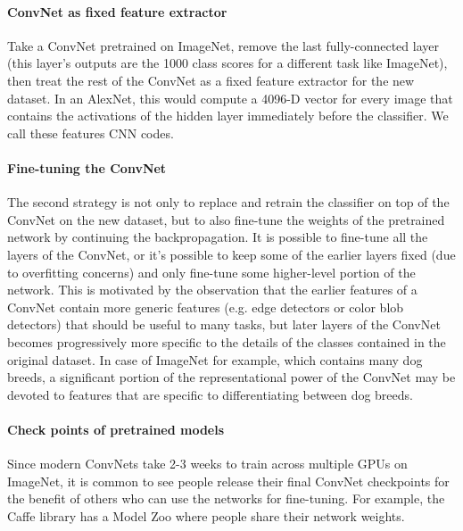 \paragraph*{ConvNet as fixed feature extractor} Take a ConvNet pretrained on ImageNet, remove the last fully-connected layer (this layer’s outputs are the 1000 class scores for a different task like ImageNet), then treat the rest of the ConvNet as a fixed feature extractor for the new dataset. In an AlexNet, this would compute a 4096-D vector for every image that contains the activations of the hidden layer immediately before the classifier. We call these features CNN codes. 
\paragraph*{Fine-tuning the ConvNet} The second strategy is not only to replace and retrain the classifier on top of the ConvNet on the new dataset, but to also fine-tune the weights of the pretrained network by continuing the backpropagation. It is possible to fine-tune all the layers of the ConvNet, or it’s possible to keep some of the earlier layers fixed (due to overfitting concerns) and only fine-tune some higher-level portion of the network. This is motivated by the observation that the earlier features of a ConvNet contain more generic features (e.g. edge detectors or color blob detectors) that should be useful to many tasks, but later layers of the ConvNet becomes progressively more specific to the details of the classes contained in the original dataset. In case of ImageNet for example, which contains many dog breeds, a significant portion of the representational power of the ConvNet may be devoted to features that are specific to differentiating between dog breeds.

\paragraph*{Check points of pretrained models} Since modern ConvNets take 2-3 weeks to train across multiple GPUs on ImageNet, it is common to see people release their final ConvNet checkpoints for the benefit of others who can use the networks for fine-tuning. For example, the Caffe library has a Model Zoo where people share their network weights.

